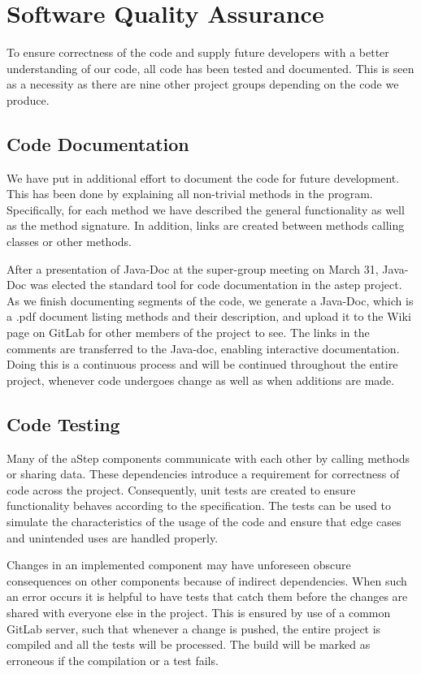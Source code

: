 \section{Software Quality Assurance}\label{sec:unit_test}
To ensure correctness of the code and supply future developers with a better understanding of our code, all code has been tested and documented. This is seen as a necessity as there are nine other project groups depending on the code we produce.

\subsection{Code Documentation} \label{sec:code_documentation}
We have put in additional effort to document the code for future development. This has been done by explaining all non-trivial methods in the program. Specifically, for each method we have described the general functionality as well as the method signature. In addition, links are created between methods calling classes or other methods. 

After a presentation of Java-Doc at the super-group meeting on March 31, Java-Doc was elected the standard tool for code documentation in the astep project.
As we finish documenting segments of the code, we generate a Java-Doc, which is a .pdf document listing methods and their description, and upload it to the Wiki page on GitLab for other members of the project to see. The links in the comments are transferred to the Java-doc, enabling interactive documentation. 
Doing this is a continuous process and will be continued throughout the entire project, whenever code undergoes change as well as when additions are made.


\subsection{Code Testing}
Many of the aStep components communicate with each other by calling methods or sharing data. These dependencies introduce a requirement for correctness of code across the project. Consequently, unit tests are created to ensure functionality behaves according to the specification. The tests can be used to simulate the characteristics of the usage of the code and ensure that edge cases and unintended uses are handled properly. 

Changes in an implemented component may have unforeseen obscure consequences on other components because of indirect dependencies. When such an error occurs it is helpful to have tests that catch them before the changes are shared with everyone else in the project. This is ensured by use of a common GitLab server, such that whenever a change is pushed, the entire project is compiled and all the tests will be processed. The build will be marked as erroneous if the compilation or a test fails.


